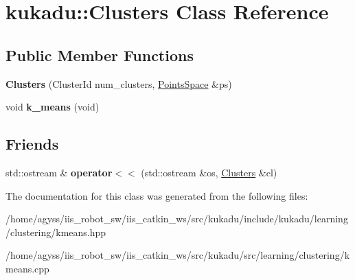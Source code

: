 \hypertarget{classkukadu_1_1Clusters}{}\section{kukadu\+:\+:Clusters Class Reference}
\label{classkukadu_1_1Clusters}
\subsection*{Public Member Functions}
\begin{DoxyCompactItemize}
\item 
{\bfseries Clusters} (Cluster\+Id num\+\_\+clusters, \hyperlink{classkukadu_1_1PointsSpace}{Points\+Space} \&ps)\hypertarget{classkukadu_1_1Clusters_ad51562cbdd79886e320e3bd135e09fa7}{}\label{classkukadu_1_1Clusters_ad51562cbdd79886e320e3bd135e09fa7}

\item 
void {\bfseries k\+\_\+means} (void)\hypertarget{classkukadu_1_1Clusters_abbecb3ad5bb32ceeea328b71cd63264c}{}\label{classkukadu_1_1Clusters_abbecb3ad5bb32ceeea328b71cd63264c}

\end{DoxyCompactItemize}
\subsection*{Friends}
\begin{DoxyCompactItemize}
\item 
std\+::ostream \& {\bfseries operator$<$$<$} (std\+::ostream \&os, \hyperlink{classkukadu_1_1Clusters}{Clusters} \&cl)\hypertarget{classkukadu_1_1Clusters_a0cd1d4240f35d52f39b3d3ac51be49b8}{}\label{classkukadu_1_1Clusters_a0cd1d4240f35d52f39b3d3ac51be49b8}

\end{DoxyCompactItemize}


The documentation for this class was generated from the following files\+:\begin{DoxyCompactItemize}
\item 
/home/agyss/iis\+\_\+robot\+\_\+sw/iis\+\_\+catkin\+\_\+ws/src/kukadu/include/kukadu/learning/clustering/kmeans.\+hpp\item 
/home/agyss/iis\+\_\+robot\+\_\+sw/iis\+\_\+catkin\+\_\+ws/src/kukadu/src/learning/clustering/kmeans.\+cpp\end{DoxyCompactItemize}
